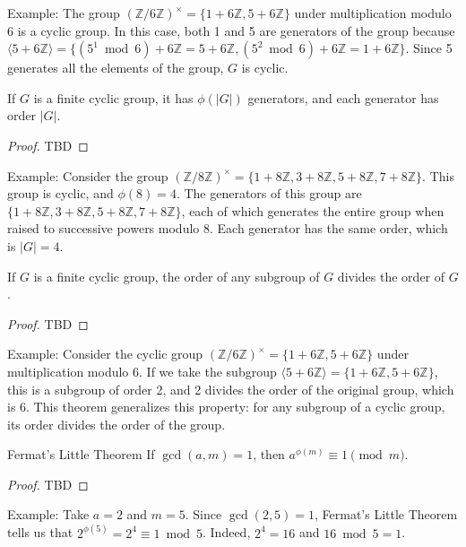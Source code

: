 \documentclass{article}
\begin{document}
Example: The group $(\mathbb{Z}/6\mathbb{Z})^{\times} = \{1+6\mathbb{Z}, 5+6\mathbb{Z}\}$ under multiplication modulo 6 is a cyclic group. In this case, both 1 and 5 are generators of the group because $\langle 5 +6\mathbb{Z} \rangle = \{(5^1 \bmod 6)+6\mathbb{Z} = 5 +6\mathbb{Z}, (5^2 \bmod 6)+6\mathbb{Z} = 1+6\mathbb{Z}\}$. Since 5 generates all the elements of the group, $G$ is cyclic.

\begin{theorem}{}{} If $G$ is a finite cyclic group, it has $\phi(|G|)$ generators, and each generator has order $|G|$. \end{theorem}

\begin{proof}
    TBD
\end{proof}

Example: Consider the group $(\mathbb{Z}/8\mathbb{Z})^{\times} = \{1+8\mathbb{Z}, 3+8\mathbb{Z}, 5+8\mathbb{Z}, 7+8\mathbb{Z}\}$. This group is cyclic, and $\phi(8) = 4$. The generators of this group are $\{1+8\mathbb{Z}, 3+8\mathbb{Z}, 5+8\mathbb{Z}, 7+8\mathbb{Z}\}$, each of which generates the entire group when raised to successive powers modulo 8. Each generator has the same order, which is $|G| = 4$.

\begin{theorem}{}{} If $G$ is a finite cyclic group, the order of any subgroup of $G$ divides the order of $G$. \end{theorem}

\begin{proof}
    TBD
\end{proof}

Example: Consider the cyclic group $(\mathbb{Z}/6\mathbb{Z})^{\times} = \{1+6\mathbb{Z}, 5+6\mathbb{Z}\}$ under multiplication modulo 6. If we take the subgroup $\langle 5+6\mathbb{Z} \rangle = \{1+6\mathbb{Z}, 5+6\mathbb{Z}\}$, this is a subgroup of order 2, and 2 divides the order of the original group, which is 6. This theorem generalizes this property: for any subgroup of a cyclic group, its order divides the order of the group.

\begin{theorem}{Fermat's Little Theorem}{} If $\gcd(a, m) = 1$, then $a^{\phi(m)} \equiv 1 \pmod{m}$. \end{theorem}

\begin{proof}
    TBD
\end{proof}

Example: Take $a = 2$ and $m = 5$. Since $\gcd(2, 5) = 1$, Fermat's Little Theorem tells us that $2^{\phi(5)} = 2^4 \equiv 1 \bmod 5$. Indeed, $2^4 = 16$ and $16 \bmod 5 = 1$.
\end{document}
